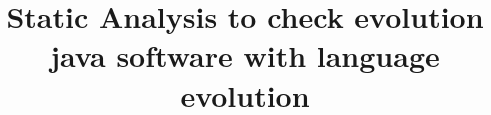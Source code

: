 \documentclass[licenciatura]{unb-cic}
\title{Static Analysis to check evolution java software with language evolution}
\begin{document}
  \maketitle
  \pretextual

  \begin{dedicatoria}
	  
  \end{dedicatoria}

  \begin{agradecimentos}
	
  \end{agradecimentos}

  \begin{resumo}
	
  \end{resumo}


  \begin{abstract}
  	
  \end{abstract}
  
  

  \tableofcontents
  \listoffigures
  \listoftables
  
  
%  
  
  

  \textual
  
  

  \postextual
  
  
\end{document}
